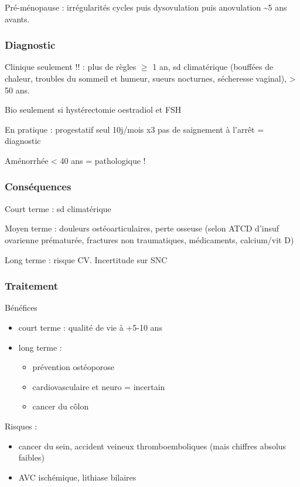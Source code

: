 \documentclass{book}
\begin{document}
Pré-ménopause : irrégularités cycles puis dysovulation puis anovulation \textasciitilde{}5 ans
avants.

\subsubsection{Diagnostic}
\label{sec:org2627025}
Clinique seulement !! : plus de règles \(\ge\) 1 an, sd climatérique (bouffées de chaleur, troubles du
sommeil et humeur, sueurs nocturnes, sécheresse vaginal), \female > 50 ans. 

Bio seulement si hystérectomie \thus \dec oestradiol et \inc FSH

En pratique : progestatif seul 10j/mois x3 \thus pas de saignement à l'arrêt =
diagnostic

Aménorrhée < 40 ans = pathologique !

\subsubsection{Conséquences}
\label{sec:org8e6ea3e}
Court terme : sd climatérique

Moyen terme : douleurs ostéoarticulaires, \inc perte osseuse (selon ATCD d'insuf
ovarienne prématurée, fractures non traumatiques, médicaments, calcium/vit D)

Long terme : \inc risque CV. Incertitude sur SNC

\subsubsection{Traitement}
\label{sec:org1ddcef4}
Bénéfices
\begin{itemize}
\item court terme : qualité de vie à +5-10 ans
\item long terme :
\begin{itemize}
\item prévention ostéoporose
\item cardiovasculaire et neuro = incertain
\item cancer du côlon
\end{itemize}
\end{itemize}
Risques :
\begin{itemize}
\item \inc cancer du sein, accident veineux thromboemboliques (mais chiffres absolus
faibles)
\item \inc AVC ischémique, lithiase bilaires
\end{itemize}
\end{document}
